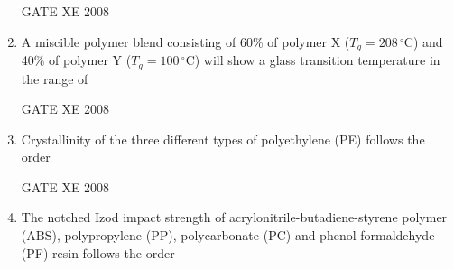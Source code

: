 \documentclass[12pt]{article}
\begin{document}
\begin{enumerate}[label=Q\arabic*.]
GATE XE 2008

\item A miscible polymer blend consisting of 60\% of polymer X ($T_g = 208 \, ^\circ\text{C}$) and 40\% of polymer Y ($T_g = 100 \, ^\circ\text{C}$) will show a glass transition temperature in the range of

\begin{enumerate}[label=(\Alph*)]
\end{enumerate}

GATE XE 2008

\item Crystallinity of the three different types of polyethylene (PE) follows the order

\begin{enumerate}[label=(\Alph*)]
\end{enumerate}

GATE XE 2008

\item The notched Izod impact strength of acrylonitrile-butadiene-styrene polymer (ABS), polypropylene (PP), polycarbonate (PC) and phenol-formaldehyde (PF) resin follows the order

\begin{enumerate}[label=(\Alph*)]
\end{enumerate}


\end{enumerate}
\end{document}
